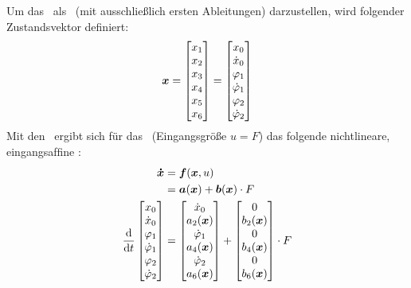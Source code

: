 Um das \spds\ als \zrm\ (mit ausschließlich ersten Ableitungen) darzustellen, wird folgender Zustandsvektor definiert:
\begin{align}
	\boldsymbol{x} = \begin{bmatrix}
		x_1 \\	x_2 \\	x_3 \\	x_4 \\	x_5 \\	x_6 \\	
	\end{bmatrix} = \begin{bmatrix}
		x_0 \\ \dot{x}_0 \\ \varphi_1 \\ \dot{\varphi}_1 \\ \varphi_2 \\ \dot{\varphi}_2
	\end{bmatrix}
	\label{eq:vex}
\end{align}
Mit den \bwgl\ ergibt sich für das \krs\ (Eingangsgröße $u=F$) das folgende nichtlineare, eingangsafﬁne \zrm:
\begin{align}
	\vexp &= \ve{f}(\vex,u)  \\
		&= \ve{a}(\vex) + \ve{b}(\vex) \cdot F  \label{eq:zrm} \\\vspace{100cm}
	\ddt \begin{bmatrix}
		\xo \\ \xop \\ \phe \\ \phep \\ \phz \\ \phzp
	\end{bmatrix} &= \begin{bmatrix}
		\xop \\ a_2(\vex) \\ \phep \\  a_4(\vex) \\ \phzp \\  a_6(\vex)
	\end{bmatrix} + \begin{bmatrix}
		0 \\ b_2(\vex) \\ 0 \\  b_4(\vex) \\ 0 \\  b_6(\vex)
	\end{bmatrix} \cdot F
\end{align}

